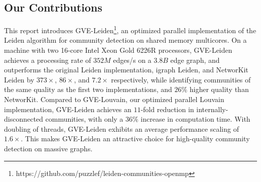 






\subsection{Our Contributions}

This report introduces GVE-Leiden\footnote{https://github.com/puzzlef/leiden-communities-openmp}, an optimized parallel implementation of the Leiden algorithm for community detection on shared memory multicores. On a machine with two 16-core Intel Xeon Gold 6226R processors, GVE-Leiden achieves a processing rate of $352 M$ edges/s on a $3.8 B$ edge graph, and outperforms the original Leiden implementation, igraph Leiden, and NetworKit Leiden by $373\times$, $86\times$, and $7.2\times$ respectively, while identifying communities of the same quality as the first two implementations, and $26\%$ higher quality than NetworKit. Compared to GVE-Louvain, our optimized parallel Louvain implementation, GVE-Leiden achieves an $11$-fold reduction in internally-disconnected communities, with only a $36\%$ increase in computation time. With doubling of threads, GVE-Leiden exhibits an average performance scaling of $1.6\times$. This makes GVE-Leiden an attractive choice for high-quality community detection on massive graphs.





